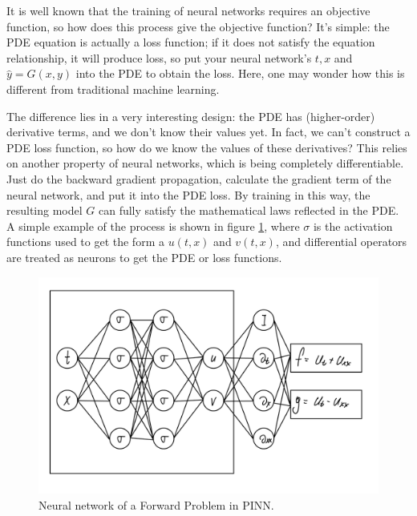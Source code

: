\documentclass[12pt]{article}
\begin{document}
It is well known that the training of neural networks requires an objective function, so how does this process give the objective function? It's simple: the PDE equation is actually a loss function; if it does not satisfy the equation relationship, it will produce loss, so put your neural network's $t,x$ and $\hat{y}=G(x,y)$ into the PDE to obtain the loss. Here, one may wonder how this is different from traditional machine learning.

The difference lies in a very interesting design: the PDE has (higher-order) derivative terms, and we don't know their values yet. In fact, we can't construct a PDE loss function, so how do we know the values of these derivatives? This relies on another property of neural networks, which is being completely differentiable. Just do the backward gradient propagation, calculate the gradient term of the neural network, and put it into the PDE loss. By training in this way, the resulting model $G$ can fully satisfy the mathematical laws reflected in the PDE. A simple example of the process is shown in figure \ref{fig:FP}, where $\sigma$ is the activation functions used to get the form a $u(t,x)$ and $v(t,x)$, and differential operators are treated as neurons to get the PDE or loss functions. 

\begin{figure}[!t]
  \centering
  \includegraphics[width=\textwidth]{FP.jpeg}
  \caption{Neural network of a Forward Problem in PINN.}
  \label{fig:FP}
\end{figure}
\end{document}
